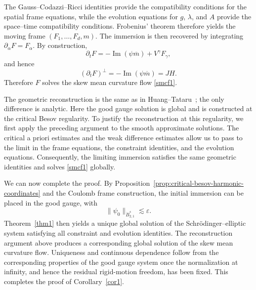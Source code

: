 \documentclass[11pt,letterpaper,reqno]{amsart}
\numberwithin{equation}{section}
\theoremstyle{definition}
\theoremstyle{remark}
\begin{document}
 The Gauss--Codazzi--Ricci identities provide the compatibility conditions
for the spatial frame equations, while the evolution equations for
\(g\), \(\lambda\), and \(A\) provide the space--time compatibility
conditions. Frobenius' theorem therefore yields the moving frame
\(
(F_1,\ldots,F_d,m).
\)
The immersion is then recovered by integrating
\(
\partial_\alpha F=F_\alpha.
\)
By construction,
\[
\partial_tF
=
-\operatorname{Im}(\psi\overline m)
+
V^\gamma F_\gamma,
\]
and hence
\[
(\partial_tF)^\perp
=
-\operatorname{Im}(\psi\overline m)
=
JH.
\]
Therefore \(F\) solves the skew mean curvature flow \eqref{smcf1}.

The geometric reconstruction is the same as in
Huang--Tataru~\cite{HT22}; the only difference is analytic. Here the
good gauge solution is global and is constructed at the critical Besov
regularity. To justify the reconstruction at this regularity, we first
apply the preceding argument to the smooth approximate solutions. The
critical a priori estimates and the weak difference estimates allow us to
pass to the limit in the frame equations, the constraint identities, and
the evolution equations. Consequently, the limiting immersion satisfies
the same geometric identities and solves \eqref{smcf1} globally.

We can now complete the proof. By
Proposition~\ref{prop:critical-besov-harmonic-coordinates} and the Coulomb
frame construction, the initial immersion can be placed in the good gauge,
with
\[
\|\psi_0\|_{\dot B^s_{2,1}}
\lesssim
\varepsilon.
\]
Theorem~\ref{thm1} then yields a unique global solution of the
Schr\"odinger--elliptic system satisfying all constraint and evolution
identities. The reconstruction argument above produces a corresponding
global solution of the skew mean curvature flow. Uniqueness and continuous
dependence follow from the corresponding properties of the good gauge
system once the normalization at infinity, and hence the residual
rigid-motion freedom, has been fixed. This completes the proof of
Corollary~\ref{cor1}.





\appendix
\end{document}
